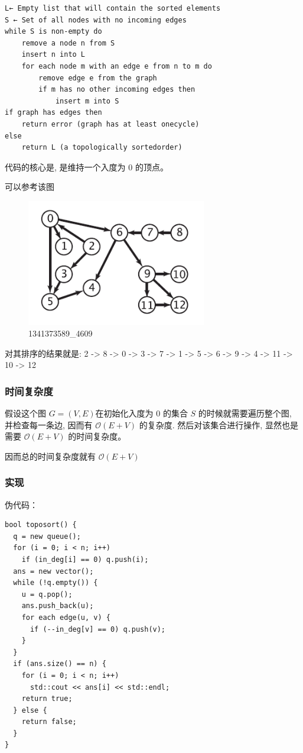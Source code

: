 \begin{verbatim}
L← Empty list that will contain the sorted elements
S ← Set of all nodes with no incoming edges
while S is non-empty do
    remove a node n from S
    insert n into L
    for each node m with an edge e from n to m do
        remove edge e from the graph
        if m has no other incoming edges then
            insert m into S
if graph has edges then
    return error (graph has at least onecycle)
else 
    return L (a topologically sortedorder)
\end{verbatim}

代码的核心是, 是维持一个入度为 0 的顶点。

可以参考该图

\begin{figure}[htbp]
\centering
\includegraphics[width=0.7\textwidth]{docs/graph/images/1341373589_4609.png} 
\caption{1341373589\_4609}
\end{figure}

对其排序的结果就是: 2 -> 8 -> 0 -> 3 -> 7 -> 1 -> 5 -> 6 -> 9 -> 4 -> 11 -> 10 -> 12

\subsubsection{时间复杂度}

假设这个图 $G = (V, E)$在初始化入度为 0 的集合 $S$ 的时候就需要遍历整个图, 并检查每一条边, 因而有 $\mathcal{O}(E+V)$ 的复杂度. 然后对该集合进行操作, 显然也是需要 $\mathcal{O}(E+V)$ 的时间复杂度。

因而总的时间复杂度就有 $\mathcal{O}(E+V)$

\subsubsection{实现}

伪代码：

\begin{verbatim}
bool toposort() {
  q = new queue();
  for (i = 0; i < n; i++)
    if (in_deg[i] == 0) q.push(i);
  ans = new vector();
  while (!q.empty()) {
    u = q.pop();
    ans.push_back(u);
    for each edge(u, v) {
      if (--in_deg[v] == 0) q.push(v);
    }
  }
  if (ans.size() == n) {
    for (i = 0; i < n; i++)
      std::cout << ans[i] << std::endl;
    return true;
  } else {
    return false;
  }
}
\end{verbatim}


